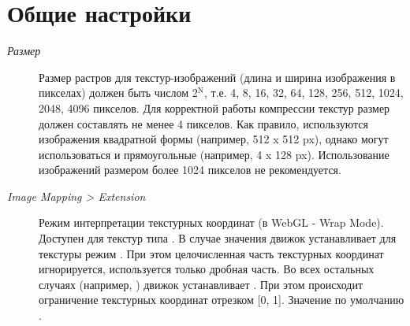 \documentclass[a4paper,12pt,oneside]{sphinxmanual}
\begin{document}
\section{Общие настройки}
\label{textures:id3}\label{textures:index-2}\begin{description}
\item[{\emph{Размер}}] \leavevmode
Размер растров для текстур-изображений (длина и ширина изображения в пикселах) должен быть числом 2$^{\text{N}}$, т.е. 4, 8, 16, 32, 64, 128, 256, 512, 1024, 2048, 4096 пикселов. Для корректной работы компрессии текстур размер должен составлять не менее 4 пикселов. Как правило, используются изображения квадратной формы (например, 512 x 512 px), однако могут использоваться и прямоугольные (например, 4 x 128 px). Использование изображений размером более 1024 пикселов не рекомендуется.

\item[{\emph{Image Mapping \textgreater{} Extension}}] \leavevmode
Режим интерпретации текстурных координат (в WebGL - Wrap Mode). Доступен для текстур типа . В случае значения  движок устанавливает для текстуры режим . При этом целочисленная часть текстурных координат игнорируется, используется только дробная часть. Во всех остальных случаях (например, ) движок устанавливает . При этом происходит ограничение текстурных координат отрезком {[}0, 1{]}. Значение по умолчанию .

\end{description}
\end{document}
